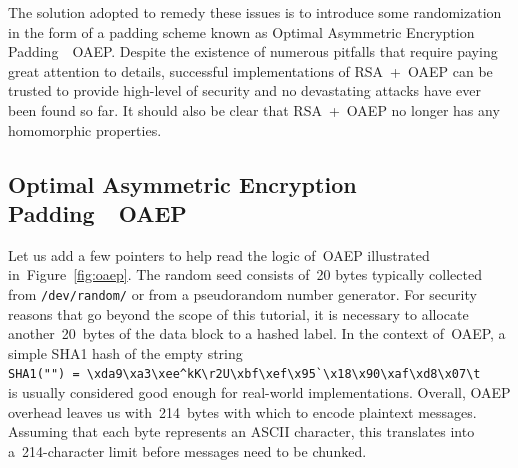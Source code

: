 \documentclass{article}
\begin{document}
\noindent The solution adopted to remedy these issues is to introduce some randomization in the form of a padding scheme known as Optimal Asymmetric Encryption Padding~\textemdash~OAEP.  Despite the existence of numerous pitfalls that require paying great attention to details, successful implementations of RSA~+~OAEP can be trusted to provide high-level of security and no devastating attacks have ever been found so far. It should also be clear that RSA~+~OAEP no longer has any homomorphic properties.

\subsection{Optimal Asymmetric Encryption Padding~\textemdash~OAEP}  

Let us add a few pointers to help read the logic of~OAEP illustrated in~Figure~\ref{fig:oaep}.  The random seed consists of~20 bytes typically collected from \texttt{/dev/random/} or from a pseudorandom number generator. For security reasons that go beyond the scope of this tutorial, it is necessary to allocate another~20~bytes of the data block to a hashed label.  In the context of~OAEP, a simple SHA1 hash of the empty string \\

\noindent \verb$SHA1("") = \xda9\xa3\xee^kK\r2U\xbf\xef\x95`\x18\x90\xaf\xd8\x07\t$ \\

\noindent is usually considered good enough for real-world implementations. Overall, OAEP overhead leaves us with~214~bytes with which to encode plaintext messages.  Assuming that each byte represents an ASCII character, this translates into a~214-character limit before messages need to be chunked.

\newpage
\end{document}

